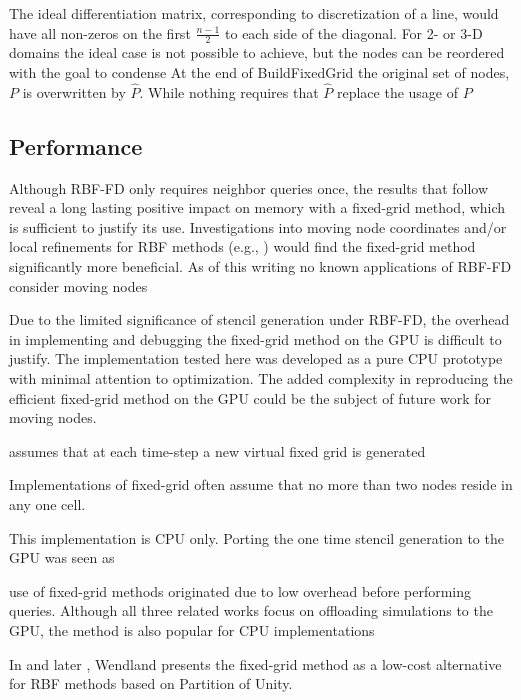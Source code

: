 \documentclass{report}
\begin{document}

The ideal differentiation matrix, corresponding to discretization of a line, would have all non-zeros on the first $\frac{n-1}{2}$ to each side of the diagonal. For 2- or 3-D domains the ideal case is not possible to achieve, but the nodes can be reordered with the goal to condense
At the end of BuildFixedGrid the original set of nodes, $P$ is overwritten by $\hat{P}$. While nothing requires that $\hat{P}$ replace the usage of $P$ 


\subsection{Performance} 

Although RBF-FD only requires neighbor queries once, the results that follow reveal a long lasting positive impact on memory with a fixed-grid method, which is sufficient to justify its use. Investigations into moving node coordinates and/or local refinements for RBF methods (e.g., \cite{FlyerLehto10}) would find the fixed-grid method significantly more beneficial. As of this writing no known applications of RBF-FD consider moving nodes

Due to the limited significance of stencil generation under RBF-FD, the overhead in implementing and debugging the fixed-grid method on the GPU is difficult to justify. The implementation tested here was developed as a pure CPU prototype with minimal attention to optimization. The added complexity in reproducing the efficient fixed-grid method on the GPU could be the subject of future work for moving nodes. 

    
\cite{Krog2010} assumes that at each time-step a new virtual fixed grid is generated 


Implementations of fixed-grid often assume that no more than two nodes reside in any one cell.  

This implementation is CPU only. Porting the one time stencil generation to the GPU was seen as 

use of fixed-grid methods originated due to low overhead before performing queries.
Although all three related works focus on offloading simulations to the GPU, the method is also popular for CPU implementations 

In \cite{Wendland2002} and later \cite{WendlandBook}, Wendland presents the fixed-grid method as a low-cost alternative for RBF methods based on Partition of Unity. %
\end{document}
